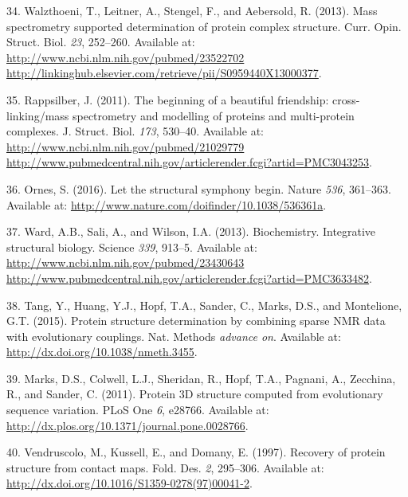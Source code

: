 \documentclass[11pt,a4paper,twoside]{book}
\theoremstyle{definition}
\theoremstyle{definition}
\theoremstyle{remark}
\begin{document}
\hypertarget{ref-Walzthoeni2013}{}
34. Walzthoeni, T., Leitner, A., Stengel, F., and Aebersold, R. (2013).
Mass spectrometry supported determination of protein complex structure.
Curr. Opin. Struct. Biol. \emph{23}, 252--260. Available at:
\href{http://www.ncbi.nlm.nih.gov/pubmed/23522702\%20http://linkinghub.elsevier.com/retrieve/pii/S0959440X13000377}{http://www.ncbi.nlm.nih.gov/pubmed/23522702 http://linkinghub.elsevier.com/retrieve/pii/S0959440X13000377}.

\hypertarget{ref-Rappsilber2011}{}
35. Rappsilber, J. (2011). The beginning of a beautiful friendship:
cross-linking/mass spectrometry and modelling of proteins and
multi-protein complexes. J. Struct. Biol. \emph{173}, 530--40. Available
at:
\href{http://www.ncbi.nlm.nih.gov/pubmed/21029779\%20http://www.pubmedcentral.nih.gov/articlerender.fcgi?artid=PMC3043253}{http://www.ncbi.nlm.nih.gov/pubmed/21029779 http://www.pubmedcentral.nih.gov/articlerender.fcgi?artid=PMC3043253}.

\hypertarget{ref-Ornes2016}{}
36. Ornes, S. (2016). Let the structural symphony begin. Nature
\emph{536}, 361--363. Available at:
\url{http://www.nature.com/doifinder/10.1038/536361a}.

\hypertarget{ref-Ward2013}{}
37. Ward, A.B., Sali, A., and Wilson, I.A. (2013). Biochemistry.
Integrative structural biology. Science \emph{339}, 913--5. Available
at:
\href{http://www.ncbi.nlm.nih.gov/pubmed/23430643\%20http://www.pubmedcentral.nih.gov/articlerender.fcgi?artid=PMC3633482}{http://www.ncbi.nlm.nih.gov/pubmed/23430643 http://www.pubmedcentral.nih.gov/articlerender.fcgi?artid=PMC3633482}.

\hypertarget{ref-Tang2015}{}
38. Tang, Y., Huang, Y.J., Hopf, T.A., Sander, C., Marks, D.S., and
Montelione, G.T. (2015). Protein structure determination by combining
sparse NMR data with evolutionary couplings. Nat. Methods \emph{advance
on}. Available at: \url{http://dx.doi.org/10.1038/nmeth.3455}.

\hypertarget{ref-Marks2011}{}
39. Marks, D.S., Colwell, L.J., Sheridan, R., Hopf, T.A., Pagnani, A.,
Zecchina, R., and Sander, C. (2011). Protein 3D structure computed from
evolutionary sequence variation. PLoS One \emph{6}, e28766. Available
at: \url{http://dx.plos.org/10.1371/journal.pone.0028766}.

\hypertarget{ref-Vendruscolo1997}{}
40. Vendruscolo, M., Kussell, E., and Domany, E. (1997). Recovery of
protein structure from contact maps. Fold. Des. \emph{2}, 295--306.
Available at: \url{http://dx.doi.org/10.1016/S1359-0278(97)00041-2}.
\end{document}
